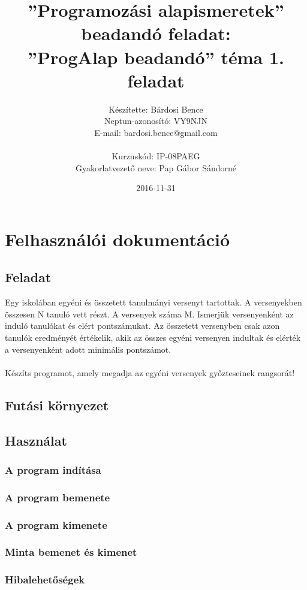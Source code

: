 \documentclass{article}
\title{”Programozási alapismeretek”\\ beadandó feladat:\\ ”ProgAlap beadandó” téma 1. feladat}
\date{2016-11-31}
\author{Készítette: Bárdosi Bence\\ Neptun-azonosító: VY9NJN\\ E-mail: bardosi.bence@gmail.com\\\\ Kurzuskód: IP-08PAEG\\ Gyakorlatvezető neve: Pap Gábor Sándorné}
\begin{document}
  \maketitle
  \newpage

  \tableofcontents
  \newpage

  \section{Felhasználói dokumentáció}
    \subsection{Feladat}
      Egy iskolában egyéni és összetett tanulmányi versenyt tartottak. A versenyekben összesen N tanuló vett részt. A versenyek száma M. Ismerjük versenyenként az induló tanulókat és elért pontszámukat. Az összetett versenyben csak azon tanulók eredményét értékelik, akik az összes egyéni versenyen indultak és elérték a versenyenként adott minimális pontszámot.
      \\
      \\ Készíts programot, amely megadja az egyéni versenyek győzteseinek rangsorát!
    \subsection{Futási környezet}
    \subsection{Használat}
      \subsubsection{A program indítása}
      \subsubsection{A program bemenete}
      \subsubsection{A program kimenete}
      \subsubsection{Minta bemenet és kimenet}
      \subsubsection{Hibalehetőségek}
  \newpage
\end{document}
